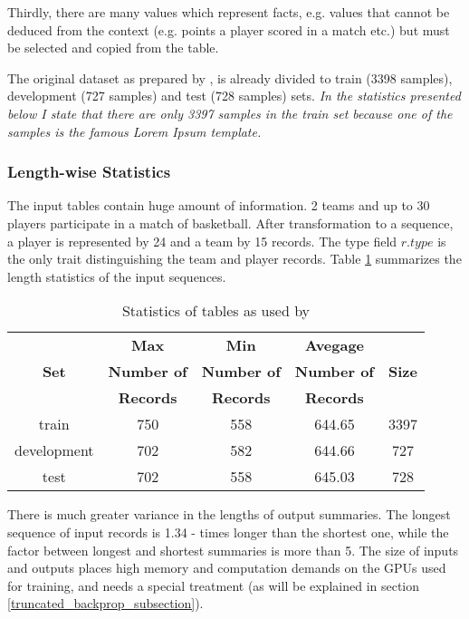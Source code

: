 Thirdly, there are many values which represent facts, e.g. values that cannot be deduced from the context (e.g. points a player scored in a match etc.) but must be selected and copied from the table.

The original dataset as prepared by \citep{wiseman2017}, is already divided to train (3398 samples), development (727 samples) and test (728 samples) sets. \emph{In the statistics presented below I state that there are only 3397 samples in the train set because one of the samples is the famous Lorem Ipsum template.}

\subsubsection{Length-wise Statistics}

The input tables contain huge amount of information. 2 teams and up to 30 players participate in a match of basketball. After transformation to a sequence, a player is represented by 24 and a team by 15 records. The type field $r.type$ is the only trait distinguishing the team and player records. Table \ref{stats_tables_orig_rw} summarizes the length statistics of the input sequences. 

\begin{table}[h!]
    \centering
    \begin{tabular}{ccccc}
        \toprule
        {}    & \textbf{Max} & \textbf{Min} & \textbf{Avegage}& {} \\
        \textbf{Set} & \textbf{Number of} & \textbf{Number of} & \textbf{Number of} & \textbf{Size} \\
        {} & \textbf{Records} & \textbf{Records} & \textbf{Records} & {} \\
        \midrule
        train       & 750 & 558 & 644.65 & 3397  \\
        development & 702 & 582 & 644.66 & 727 \\
        test        & 702 & 558 & 645.03 & 728
    \end{tabular}
    \caption{Statistics of tables as used by \citep{wiseman2017}} \label{stats_tables_orig_rw}
\end{table}

There is much greater variance in the lengths of output summaries. The longest sequence of input records is 1.34 - times longer than the shortest one, while the factor between longest and shortest summaries is more than 5. The size of inputs and outputs places high memory and computation demands on the GPUs used for training, and needs a special treatment (as will be explained in section \ref{truncated_backprop_subsection}).

